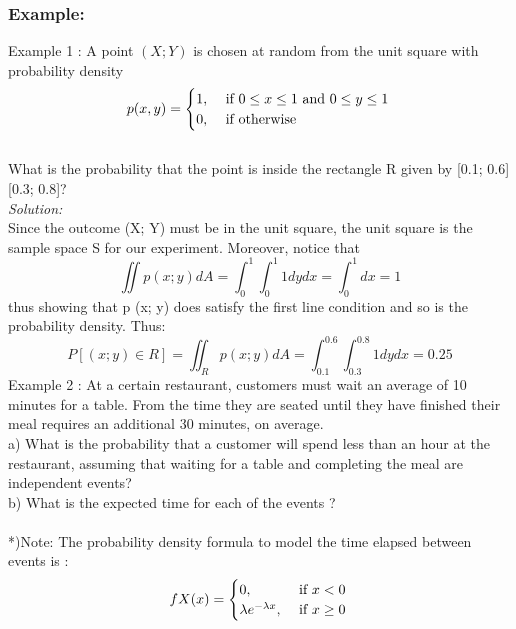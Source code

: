 \documentclass[a4paper]{article}
\begin{document}
\subsubsection*{Example:}
Example 1 : A point $(X; Y )$ is chosen at random from the unit square with probability density\\
\begin{equation*}
	p(x,y) = \begin{cases}1, & \text{ if } 0 \leq x \leq 1 \text{ and } 0\leq y \leq 1\\ 0,& \text{ if otherwise} \end{cases}\\
\end{equation*}
\\
What is the probability that the point is inside the rectangle R given by [0.1; 0.6] [0.3; 0.8]? \\
\textit{Solution:} \\
Since the outcome (X; Y) must be in the unit square, the unit square is the sample space S for our experiment. Moreover, notice that
\begin{equation*}
	\iint p(x;y) dA = \int_{0}^{1}\int_{0}^{1} 1 dydx = \int_{0}^{1} dx = 1
\end{equation*}
thus showing that p (x; y) does satisfy the first line condition and so is the probability density. Thus:
\begin{equation*}
	P[(x;y) \in R] = \iint_R p(x;y) dA = \int_{0.1}^{0.6}\int_{0.3}^{0.8}1 dydx = 0.25
\end{equation*}
Example 2 : At a certain restaurant, customers must wait an average of 10 minutes for a table. From the time they are seated until they have finished their meal requires an additional 30 minutes, on average.\\
a) What is the probability that a customer will spend less than an hour at the restaurant, assuming that waiting for a table and completing the meal are independent events?\\
b) What is the expected time for each of the events ?\\\\
*)Note: The probability density formula to model the time elapsed between events is :
\begin{equation*}
	fX(x) = \begin{cases} 0,& \text{ if } x < 0 \\ \lambda e^{-\lambda x}, &\text{ if } x \geq 0 \end{cases} \\
\end{equation*}
\end{document}
